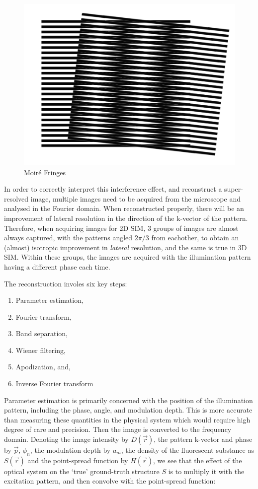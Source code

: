 \documentclass[12pt]{article}
\begin{document}
\begin{figure}[hbt]
    \includegraphics[scale=0.5]{figures/moire.png}
    \caption{Moir\'{e} Fringes}
    \label{fig:moire}
\end{figure}

In order to correctly interpret this interference effect, and reconstruct a super-resolved image,
multiple images need to be acquired from the microscope and analysed in the Fourier domain.
When reconstructed properly, there will be an improvement of lateral resolution in the direction of the k-vector of the pattern.
Therefore, when acquiring images for 2D SIM, 3 groups of images are almost always captured,
with the patterns angled $2\pi/3$ from eachother, to obtain an (almost) isotropic improvement in \textit{lateral} resolution,
and the same is true in 3D SIM.
Within these groups, the images are acquired with the illumination pattern having a different phase each time.

The reconstruction involes six key steps:
\begin{enumerate}
    \item Parameter estimation,
    \item Fourier transform,
    \item Band separation,
    \item Wiener filtering,
    \item Apodization, and,
    \item Inverse Fourier transform
\end{enumerate}

Parameter estimation is primarily concerned with the position of the illumination pattern,
including the phase, angle, and modulation depth.
This is more accurate than measuring these quantities in the physical system which would require high degree of care and precision.
Then the image is converted to the frequency domain.
Denoting the image intensity by $D(\vec{r})$, the pattern k-vector and phase by $\vec{p}$, $\phi_n$,
the modulation depth by $a_m$, the density of the fluorescent substance as $S(\vec{r})$ and the point-spread function by $H(\vec{r})$,
we see that the effect of the optical system on the `true' ground-truth structure $S$ is to multiply it with the excitation pattern,
and then convolve with the point-spread function:
\end{document}
